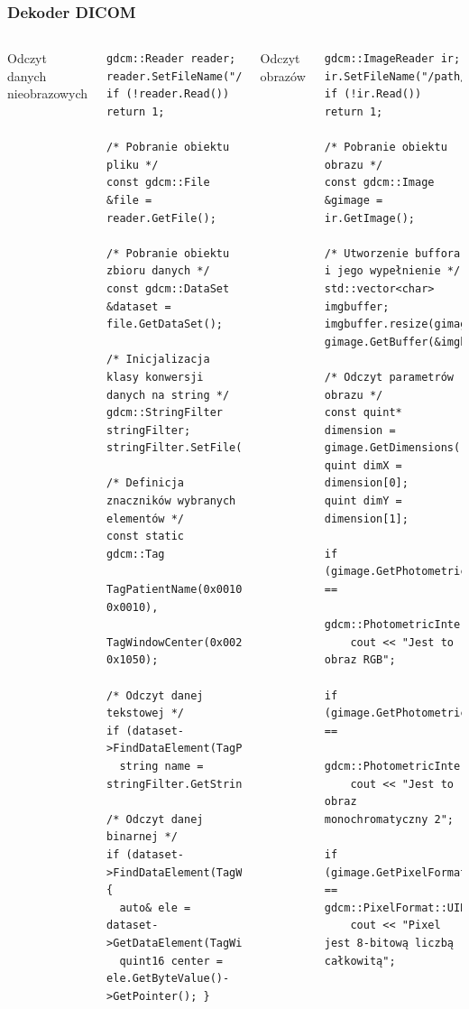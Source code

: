 \documentclass[aspectratio=169]{beamer}
\begin{document}
\begin{frame}[t,fragile]
    \frametitle{Dekoder DICOM}
    \vspace{-1em}
    \begin{columns}[t]
        Odczyt danych nieobrazowych
        \begin{lstlisting}[basicstyle=\ttfamily\tiny,numbers=none]
gdcm::Reader reader;
reader.SetFileName("/path/to/file");
if (!reader.Read()) return 1;

/* Pobranie obiektu pliku */
const gdcm::File &file = reader.GetFile();

/* Pobranie obiektu zbioru danych */
const gdcm::DataSet &dataset = file.GetDataSet();

/* Inicjalizacja klasy konwersji danych na string */
gdcm::StringFilter stringFilter;
stringFilter.SetFile(file);

/* Definicja znaczników wybranych elementów */
const static gdcm::Tag
    TagPatientName(0x0010, 0x0010),
    TagWindowCenter(0x0028, 0x1050);

/* Odczyt danej tekstowej */
if (dataset->FindDataElement(TagPatientName))
  string name = stringFilter.GetString(TagPatientName);

/* Odczyt danej binarnej */
if (dataset->FindDataElement(TagWindowCenter)) {
  auto& ele = dataset->GetDataElement(TagWindowCenter);
  quint16 center = ele.GetByteValue()->GetPointer(); }
\end{lstlisting}

        Odczyt obrazów
        \begin{lstlisting}[basicstyle=\ttfamily\tiny,numbers=none]
gdcm::ImageReader ir;
ir.SetFileName("/path/to/file");
if (!ir.Read()) return 1;

/* Pobranie obiektu obrazu */
const gdcm::Image &gimage = ir.GetImage();

/* Utworzenie buffora i jego wypełnienie */
std::vector<char> imgbuffer;
imgbuffer.resize(gimage.GetBufferLength());
gimage.GetBuffer(&imgbuffer[0]);

/* Odczyt parametrów obrazu */
const quint* dimension = gimage.GetDimensions();
quint dimX = dimension[0];
quint dimY = dimension[1];

if (gimage.GetPhotometricInterpretation() == 
    gdcm::PhotometricInterpretation::RGB)
    cout << "Jest to obraz RGB";

if (gimage.GetPhotometricInterpretation() == 
    gdcm::PhotometricInterpretation::MONOCHROME2)  
    cout << "Jest to obraz monochromatyczny 2";

if (gimage.GetPixelFormat() == gdcm::PixelFormat::UINT8)
    cout << "Pixel jest 8-bitową liczbą całkowitą";
\end{lstlisting}
    \end{columns}
\end{frame}
\end{document}
